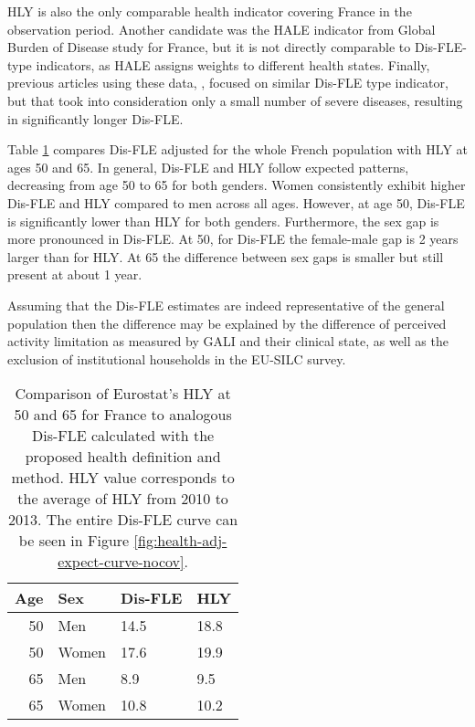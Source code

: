 \documentclass[risks,article,submit,moreauthors,pdftex]{Definitions/mdpi}
\begin{document}
HLY is also the only comparable health indicator covering France in the
observation period. Another candidate was the HALE indicator from Global
Burden of Disease study for France, but it is not directly comparable to
Dis-FLE-type indicators, as HALE assigns weights to different health
states. Finally, previous articles using these data,
\citep{guibert_mesure_2018, guibert_mesure_2018-1}, focused on similar
Dis-FLE type indicator, but that took into consideration only a small
number of severe diseases, resulting in significantly longer Dis-FLE.

Table \ref{tab:hly-comparaison} compares Dis-FLE adjusted for the whole
French population with HLY at ages 50 and 65. In general, Dis-FLE and
HLY follow expected patterns, decreasing from age 50 to 65 for both
genders. Women consistently exhibit higher Dis-FLE and HLY compared to
men across all ages. However, at age 50, Dis-FLE is significantly lower
than HLY for both genders. Furthermore, the sex gap is more pronounced
in Dis-FLE. At 50, for Dis-FLE the female-male gap is 2 years larger
than for HLY. At 65 the difference between sex gaps is smaller but still
present at about 1 year.

Assuming that the Dis-FLE estimates are indeed representative of the
general population then the difference may be explained by the
difference of perceived activity limitation as measured by GALI and
their clinical state, as well as the exclusion of institutional
households in the EU-SILC survey.

\begin{table}

\caption{\label{tab:hly-comparaison}
            Comparison of Eurostat's HLY at 50 and 65 for France to analogous
            Dis-FLE calculated with the proposed health definition and method.
            HLY value corresponds to the average of HLY from 2010 to 2013.
            The entire Dis-FLE curve can be seen in Figure \ref{fig:health-adj-expect-curve-nocov}.
        }
\centering
\begin{tabular}[t]{rlll}
\toprule
Age & Sex & Dis-FLE & HLY\\
\midrule
50 & Men & 14.5 & 18.8\\
50 & Women & 17.6 & 19.9\\
65 & Men & 8.9 & 9.5\\
65 & Women & 10.8 & 10.2\\
\bottomrule
\end{tabular}
\end{table}
\end{document}
